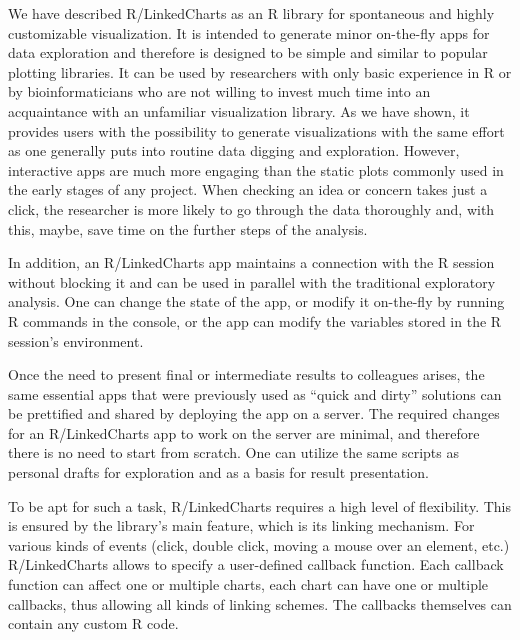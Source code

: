\documentclass[twocolumn,10pt]{article}
\begin{document}
We have described R/LinkedCharts as an R library for spontaneous and highly customizable visualization. It is intended to generate minor on-the-fly apps for data exploration and therefore is designed to be simple and similar to popular plotting libraries. It can be used by researchers with only basic experience in R or by bioinformaticians who are not willing to invest much time into an acquaintance with an unfamiliar visualization library. As we have shown, it provides users with the possibility to generate visualizations with the same effort as one generally puts into routine data digging and exploration. However, interactive apps are much more engaging than the static plots commonly used in the early stages of any project. When checking an idea or concern takes just a click, the researcher is more likely to go through the data thoroughly and, with this, maybe, save time on the further steps of the analysis.

In addition, an R/LinkedCharts app maintains a connection with the R session without blocking it and can be used in parallel with the traditional exploratory analysis. One can change the state of the app, or modify it on-the-fly by running R commands in the console, or the app can modify the variables stored in the R session's environment.

Once the need to present final or intermediate results to colleagues arises, the same essential apps that were previously used as ``quick and dirty'' solutions can be prettified and shared by deploying the app on a server. The required changes for an R/LinkedCharts app to work on the server are minimal, and therefore there is no need to start from scratch. One can utilize the same scripts as personal drafts for exploration and as a basis for result presentation.

To be apt for such a task, R/LinkedCharts requires a high level of flexibility. This is ensured by the library's main feature, which is its linking mechanism. For various kinds of events (click, double click, moving a mouse over an element, etc.) R/LinkedCharts allows to specify a user-defined callback function. Each callback function can affect one or multiple charts, each chart can have one or multiple callbacks, thus allowing all kinds of linking schemes. The callbacks themselves can contain any custom R code.
\end{document}
